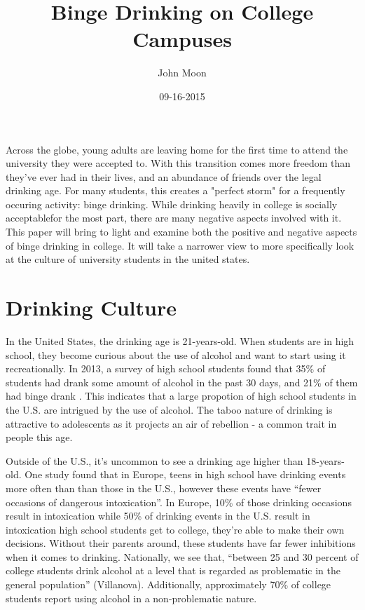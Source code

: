 \documentclass[12pt, man]{apa6}
\title{Binge Drinking on College Campuses}
\author{John Moon}
\affiliation{San Jose State University}
\date{09-16-2015}
\begin{document}
\maketitle

Across the globe, young adults are leaving home for the first time to attend the university they were accepted to. With this transition comes more freedom than they've ever had in their lives, and an abundance of friends over the legal drinking age. For many students, this creates a "perfect storm" for a frequently occuring activity: binge drinking. While drinking heavily in college is socially acceptablefor the most part, there are many negative aspects involved with it. This paper will bring to light and examine both the positive and negative aspects of binge drinking in college. It will take a narrower view to more specifically look at the culture of university students in the united states.

\section{Drinking Culture}
In the United States, the drinking age is 21-years-old. When students are in high school, they become curious about the use of alcohol and want to start using it recreationally. In 2013, a survey of high school students found that 35\% of students had drank some amount of alcohol in the past 30 days, and 21\% of them had binge drank . This indicates that a large propotion of high school students in the U.S. are intrigued by the use of alcohol. The taboo nature of drinking is attractive to adolescents as it projects an air of rebellion - a common trait in people this age.

Outside of the U.S., it's uncommon to see a drinking age higher than 18-years-old. One study found that in Europe, teens in high school have drinking events more often than than those in the U.S., however these events have ``fewer occasions of dangerous intoxication''. In Europe, 10\% of those drinking occasions result in intoxication while 50\% of drinking events in the U.S. result in intoxication high school students get to college, they're able to make their own decisions. Without their parents around, these students have far fewer inhibitions when it comes to drinking. Nationally, we see that, ``between 25 and 30 percent of college students drink alcohol at a level that is regarded as problematic in the general population'' (Villanova). Additionally, approximately 70\% of college students report using alcohol in a non-problematic nature.
\end{document}
